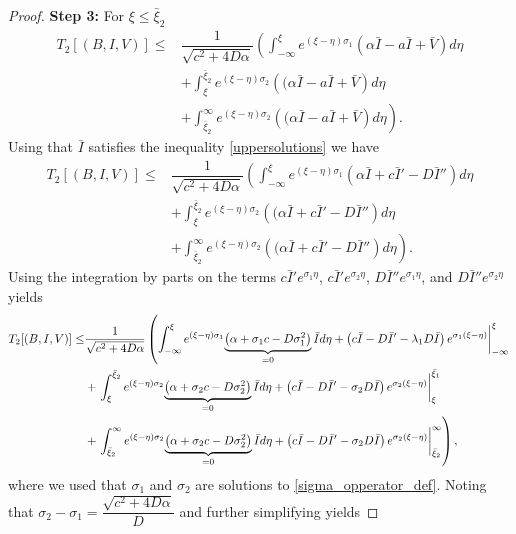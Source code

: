 \documentclass[11pt]{article}
\theoremstyle{definition}
\begin{document}
{\begin{proof}
\textbf{Step 3:} 
For $\xi \le \bar{\xi}_2$  \begin{align}
        T_2[(B,I,V)] \le & \dfrac{1}{\sqrt{c^2+4D \alpha}} \left( \int_{-\infty}^{\xi} e^{(\xi- \eta)\sigma_1} {\left(\alpha \bar I-a\bar I+\bar V  \right)}d \eta \right. \\ & + \left. \int_{\xi}^{\bar{\xi}_2} e^{(\xi- \eta)\sigma_2} {\left((\alpha \bar I-a\bar I+\bar V \right)}d \eta \right. \\&+ \left. \int_{\bar\xi_2}^{\infty} e^{(\xi- \eta)\sigma_2} {\left((\alpha \bar I-a\bar I+\bar V \right)}d \eta \right).
    \end{align}
Using that $\bar{I}$ satisfies the inequality \eqref{uppersolutions} we have 
\begin{align}
        T_2[(B,I,V)] \le & \dfrac{1}{\sqrt{c^2+4D \alpha}} \left( \int_{-\infty}^{\xi} e^{(\xi- \eta)\sigma_1} {\left(\alpha \bar I+ c\bar I'-D\bar I'' \right)}d \eta \right. \\ & + \left. \int_{\xi}^{\bar{\xi}_2} e^{(\xi- \eta)\sigma_2} {\left((\alpha \bar I+ c\bar I'-D\bar I'' \right)}d \eta \right. \\&+ \left. \int_{\bar\xi_2}^{\infty} e^{(\xi- \eta)\sigma_2} {\left((\alpha \bar I+ c\bar I'-D\bar I'' \right)}d \eta \right). \end{align}
Using the integration by parts on the terms $c \bar{I}'e^{\sigma_1\eta}$, $c \bar{I}'e^{\sigma_2\eta}$, $D \bar{I}''e^{\sigma_1\eta}$, and $D \bar{I}''e^{\sigma_2\eta}$
 yields \begin{align}
        T_2[(B,I,V)] \le & \dfrac{1}{\sqrt{c^2+4 D\alpha}} \left( \int_{-\infty}^{\xi} e^{(\xi- \eta)\sigma_1} {\underbrace{\left(\alpha + \sigma_1 c-D \sigma^2_1 \right)}_{=0}\bar{I}}d\eta + \left(c \bar{I}- D \bar I ' - \lambda_1 D \bar{I} \right) e^{\sigma_1(\xi- \eta)}\bigg{|}^\xi_{- \infty}  \right. \\ & + \left. \int_{\xi}^{\bar{\xi}_2} e^{(\xi- \eta)\sigma_2} {\underbrace{\left(\alpha + \sigma_2 c-D \sigma^2_2 \right)}_{=0}\bar{I}}d\eta + \left(c \bar{I}- D \bar I ' - \sigma_2 D \bar{I} \right) e^{\sigma_2(\xi- \eta)}\bigg{|}^{\bar{\xi}_1}_{ \xi}  \right. \\&+ \left. \int_{\bar\xi_2}^{\infty} e^{(\xi- \eta)\sigma_2} {\underbrace{\left(\alpha + \sigma_2 c-D \sigma^2_2 \right)}_{=0}\bar{I}}d\eta + \left(c \bar{I}- D \bar I ' - \sigma_2 D \bar{I} \right) e^{\sigma_2(\xi- \eta)}\bigg{|}^{\infty}_{ \bar\xi_2} \right), \end{align} where we used that $\sigma_1$ and $\sigma_2$ are solutions to \eqref{sigma_opperator_def}. Noting that $\sigma_2-\sigma_1=\dfrac{\sqrt{c^2+4D \alpha}}{D}$ and further simplifying yields 

\end{proof}}
\end{document}
